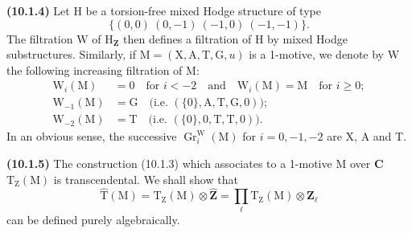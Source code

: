 \documentclass[11pt,leqno]{article}
\begin{document}
\textbf{(10.1.4)} Let \(\mathrm{H}\) be a torsion-free mixed Hodge
structure of type
\[
\{(0,0)\ (0,-1)\ (-1,0)\ (-1,-1)\}.
\]
The filtration \(\mathrm{W}\) of \(\mathrm{H}_{\mathbf{Z}}\) then defines
a filtration of \(\mathrm{H}\) by mixed Hodge
substructures. Similarly, if
\(\mathrm{M}=(\mathrm{X},\mathrm{A},\mathrm{T},\mathrm{G},u)\)
is a 1-motive, we denote by \(\mathrm{W}\) the following increasing
filtration of \(\mathrm{M}\):
\[
\begin{aligned}
\mathrm{W}_i(\mathrm{M})
  &=0 \quad \text{for }i<-2
    \quad\text{and}\quad
    \mathrm{W}_i(\mathrm{M})=\mathrm{M}
    \quad\text{for }i\geq0;
\\
\mathrm{W}_{-1}(\mathrm{M})
  &=\mathrm{G}
    \quad\text{(i.e. }(\{0\},\mathrm{A},\mathrm{T},\mathrm{G},0)\text{)};
\\
\mathrm{W}_{-2}(\mathrm{M})
  &=\mathrm{T}
    \quad\text{(i.e. }(\{0\},0,\mathrm{T},\mathrm{T},0)\text{)}.
\end{aligned}
\]
In an obvious sense, the successive
\(\operatorname{Gr}^{\mathrm{W}}_i(\mathrm{M})\) for
\(i=0,-1,-2\) are \(\mathrm{X}\), \(\mathrm{A}\) and \(\mathrm{T}\).

\textbf{(10.1.5)} The construction (10.1.3) which associates to a 1-motive
\(\mathrm{M}\) over \(\mathbf{C}\)
\(\mathrm{T}_{\mathrm{Z}}(\mathrm{M})\) is transcendental.
We shall show that
\[
\widehat{\mathrm{T}}(\mathrm{M})
=\mathrm{T}_{\mathrm{Z}}(\mathrm{M})\otimes\widehat{\mathbf{Z}}
=\prod_{\ell}\mathrm{T}_{\mathrm{Z}}(\mathrm{M})\otimes\mathbf{Z}_{\ell}
\]
can be defined purely algebraically.
\end{document}
